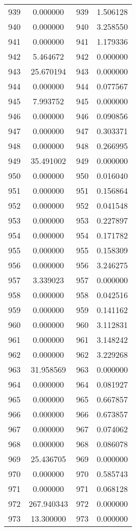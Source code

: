 \documentclass[12pt]{article}
\begin{document}
\begin{longtable}{@{}cccc@{}}
939 & 0.000000 & 939 & 1.506128 \\
940 & 0.000000 & 940 & 3.258550 \\
941 & 0.000000 & 941 & 1.179336 \\
942 & 5.464672 & 942 & 0.000000 \\
943 & 25.670194 & 943 & 0.000000 \\
944 & 0.000000 & 944 & 0.077567 \\
945 & 7.993752 & 945 & 0.000000 \\
946 & 0.000000 & 946 & 0.090856 \\
947 & 0.000000 & 947 & 0.303371 \\
948 & 0.000000 & 948 & 0.266995 \\
949 & 35.491002 & 949 & 0.000000 \\
950 & 0.000000 & 950 & 0.016040 \\
951 & 0.000000 & 951 & 0.156864 \\
952 & 0.000000 & 952 & 0.041548 \\
953 & 0.000000 & 953 & 0.227897 \\
954 & 0.000000 & 954 & 0.171782 \\
955 & 0.000000 & 955 & 0.158309 \\
956 & 0.000000 & 956 & 3.246275 \\
957 & 3.339023 & 957 & 0.000000 \\
958 & 0.000000 & 958 & 0.042516 \\
959 & 0.000000 & 959 & 0.141162 \\
960 & 0.000000 & 960 & 3.112831 \\
961 & 0.000000 & 961 & 3.148242 \\
962 & 0.000000 & 962 & 3.229268 \\
963 & 31.958569 & 963 & 0.000000 \\
964 & 0.000000 & 964 & 0.081927 \\
965 & 0.000000 & 965 & 0.667857 \\
966 & 0.000000 & 966 & 0.673857 \\
967 & 0.000000 & 967 & 0.074062 \\
968 & 0.000000 & 968 & 0.086078 \\
969 & 25.436705 & 969 & 0.000000 \\
970 & 0.000000 & 970 & 0.585743 \\
971 & 0.000000 & 971 & 0.068128 \\
972 & 267.940343 & 972 & 0.000000 \\
973 & 13.300000 & 973 & 0.000000 \\

\end{longtable}
\end{document}
